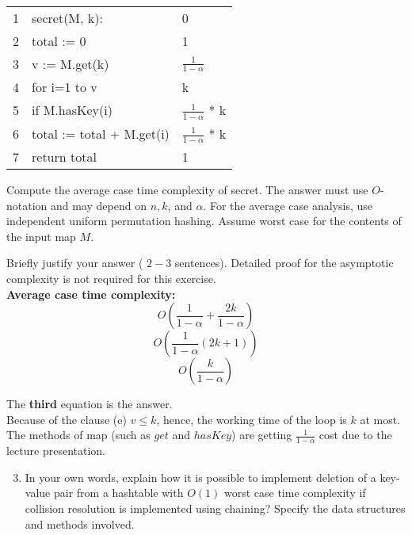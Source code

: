 \documentclass[10pt]{article}
\begin{document}
\begin{tabular}{p{3cm}p{8cm}p{3cm}}

 1 & secret(M, k): & 0 \\
 2 & \hspace{0.5cm} total := 0 & 1 \\
 3 & \hspace{0.5cm} v := M.get(k) & $\frac{1}{1 - \alpha}$ \\
 4 & \hspace{0.5cm} for i=1 to v & k \\
 5 & \hspace{1cm} if M.hasKey(i) & $\frac{1}{1 - \alpha}$ * k \\
6 & \hspace{1.5cm} total := total + M.get(i) & $\frac{1}{1 - \alpha}$ * k \\
7 & \hspace{0.5cm} return total & 1 \\
\end{tabular}

\break

Compute the average case time complexity of secret. The answer must use $O$-notation and may depend on $n, k$, and $\alpha$. For the average case analysis, use independent uniform permutation hashing. Assume worst case for the contents of the input map $M$.

Briefly justify your answer ( $2-3$ sentences). Detailed proof for the asymptotic complexity is not required for this exercise. \\

\textbf{Average case time complexity: }
\begin{equation}
  O(\frac{1}{1 - \alpha} + \frac{2k}{1 - \alpha})
\end{equation}
\begin{equation}
  O(\frac{1}{1 - \alpha}(2k + 1))
\end{equation}
\begin{equation}
  O(\frac{k}{1 - \alpha})
\end{equation}

The \textbf{third} equation is the answer. \\
Because of the clause (e) $v \leq k$, hence, the working time of the loop is $k$ at most.
The methods of map (such as $get$ and $hasKey$) are getting $\frac{1}{1 - \alpha}$ cost due to the lecture presentation.

\begin{enumerate}
  \setcounter{enumi}{2}
  \item In your own words, explain how it is possible to implement deletion of a key-value pair from a hashtable with $O(1)$ worst case time complexity if collision resolution is implemented using chaining? Specify the data structures and methods involved.
\end{enumerate}
\end{document}
